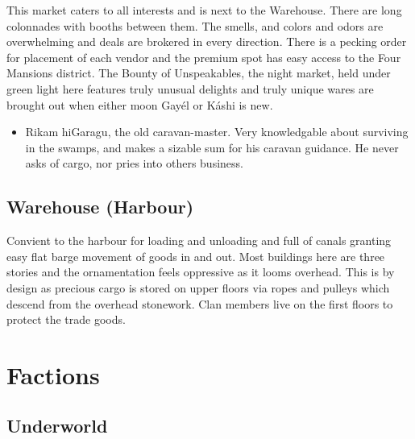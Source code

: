 This market caters to all interests and is next to the Warehouse. There are long colonnades with booths  between them. The smells, and colors and odors are overwhelming and deals are brokered in every direction. There is a pecking order for placement of each vendor and the premium spot has easy access to the Four Mansions district. The Bounty of Unspeakables, the night market, held under green light here features truly unusual delights and truly unique wares are brought out when either moon Gayél or Káshi is new.

\begin{itemize}
\item Rikam hiGaragu, the old caravan-master. Very knowledgable about surviving in the swamps, and makes a sizable sum for his caravan guidance. He never asks of cargo, nor pries into others business.
\end{itemize}


\subsection{Warehouse (Harbour)}

Convient to the harbour for loading and unloading and full of canals granting easy flat barge movement of goods in and out. Most buildings here are three stories and the ornamentation feels oppressive as it looms overhead. This is by design as precious cargo is stored on upper floors via ropes and pulleys which descend from the overhead stonework. Clan members live on the first floors to protect the trade goods.

\section{Factions}

\subsection{Underworld}

